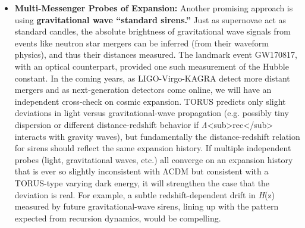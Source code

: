 \documentclass[
]{article}
\begin{document}
\begin{itemize}
  clustering (lower
  S\textless sub\textgreater8\textless/sub\textgreater) than predicted
  by Planck CMB results under ΛCDM. TORUS provides a framework where
  recursion-induced modifications could \textbf{suppress the growth of
  structure on certain scales}, offering a possible explanation for this
  discrepancy\hspace{0pt}. Future surveys will clarify this: LSST and
  Euclid will measure the growth rate and clustering amplitude to
  unprecedented accuracy, tracking structure formation from early times
  to now. If they confirm a persistent deviation -- for example, a
  scale-dependent growth rate or an
  S\textless sub\textgreater8\textless/sub\textgreater{} value that
  remains significantly lower than ΛCDM predicts -- it could be a
  \textbf{signature of TORUS's extra gravity terms} influencing
  structure formation\hspace{0pt}. Conversely, if structure growth and
  clustering amplitude perfectly match the ΛCDM predictions when
  observational uncertainties shrink, it would constrain or rule out the
  need for any recursion-based modification in the dark energy or
  gravity sector.
\item
  \textbf{Multi-Messenger Probes of Expansion:} Another promising
  approach is using \textbf{gravitational wave ``standard sirens.''}
  Just as supernovae act as standard candles, the absolute brightness of
  gravitational wave signals from events like neutron star mergers can
  be inferred (from their waveform physics), and thus their distances
  measured. The landmark event GW170817, with an optical counterpart,
  provided one such measurement of the Hubble constant. In the coming
  years, as LIGO-Virgo-KAGRA detect more distant mergers and as
  next-generation detectors come online, we will have an independent
  cross-check on cosmic expansion. TORUS predicts only slight deviations
  in light versus gravitational-wave propagation (e.g. possibly tiny
  dispersion or different distance-redshift behavior if
  \emph{Λ}\textless sub\textgreater rec\textless/sub\textgreater{}
  interacts with gravity waves\hspace{0pt}), but fundamentally the
  distance-redshift relation for sirens should reflect the same
  expansion history. If multiple independent probes (light,
  gravitational waves, etc.) all converge on an expansion history that
  is ever so slightly inconsistent with ΛCDM but consistent with a
  TORUS-type varying dark energy, it will strengthen the case that the
  deviation is real. For example, a subtle redshift-dependent drift in
  \emph{H}(z) measured by future gravitational-wave sirens, lining up
  with the pattern expected from recursion dynamics, would be
  compelling.
\end{itemize}
\end{document}
